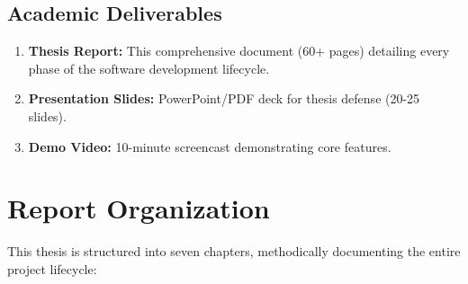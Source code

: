 \subsection{Academic Deliverables}

\begin{enumerate}
    \item \textbf{Thesis Report:} This comprehensive document (60+ pages) detailing every phase of the software development lifecycle.
    
    \item \textbf{Presentation Slides:} PowerPoint/PDF deck for thesis defense (20-25 slides).
    
    \item \textbf{Demo Video:} 10-minute screencast demonstrating core features.
\end{enumerate}

\section{Report Organization}

This thesis is structured into seven chapters, methodically documenting the entire project lifecycle:

